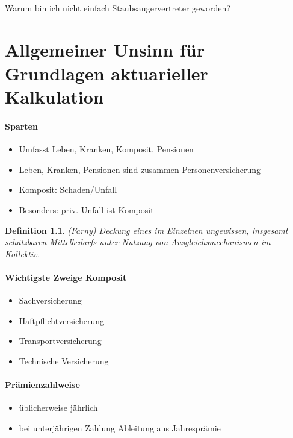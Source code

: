 \documentclass[12pt]{report}
\theoremstyle{dotless}
\newtheorem{defn}[thm]{Definition}
\theoremstyle{definition}
\begin{document}
\begin{titlepage}
	Warum bin ich nicht einfach Staubsaugervertreter geworden? 
\end{titlepage}

\tableofcontents

\chapter{Allgemeiner Unsinn für Grundlagen aktuarieller Kalkulation}

\subsubsection{Sparten}
\begin{itemize}
	\item Umfasst Leben, Kranken, Komposit, Pensionen
	\item Leben, Kranken, Pensionen sind zusammen Personenversicherung
	\item Komposit: Schaden/Unfall
	\item Besonders: priv. Unfall ist Komposit
\end{itemize}

\begin{defn} (Farny)
	Deckung eines im Einzelnen ungewissen, insgesamt schätzbaren Mittelbedarfs unter Nutzung von Ausgleichsmechanismen im Kollektiv.
\end{defn}

\subsubsection{Wichtigste Zweige Komposit}
\begin{itemize}
	\item Sachversicherung
	\item Haftpflichtversicherung
	\item Transportversicherung
	\item Technische Versicherung
\end{itemize}

\subsubsection{Prämienzahlweise}
\begin{itemize}
	\item üblicherweise jährlich
	\item bei unterjährigen Zahlung Ableitung aus Jahresprämie
\end{itemize}
\end{document}
